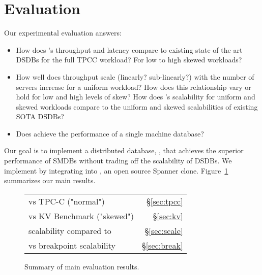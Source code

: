 \section{Evaluation}
\label{sec:eval}

Our experimental evaluation answers:
\begin{itemize}
\item How does \name{}'s throughput and latency compare to existing state of the art DSDBs for the full TPCC workload? For low to high skewed workloads? 
\item How well does throughput scale (linearly? sub-linearly?) with the number of servers increase for a uniform workload? How does this relationship vary or hold for low and high levels of skew? How does \name{}'s scalability for uniform and skewed workloads compare to the uniform and skewed scalabilities of existing SOTA DSDBs?
\item Does \name{} achieve the performance of a single machine database? 
\end{itemize}

Our goal is to implement a distributed database, \name{}, that achieves the superior performance of SMDBs without trading off the scalability of DSDBs. We implement \name{} by integrating \smdb{} \cite{cicada} into \dsdb{}\cite{cockroachdb}, an open source Spanner \cite{spanner} clone. Figure~\ref{fig:eval_summary} summarizes our main results.\\


\begin{figure}	
\begin{tabular}{@{}p{} r@{}}
\midrule
\name{} vs \dsdb{} TPC-C ("normal") & \S\ref{sec:tpcc}\\
\name{} vs \dsdb{} KV Benchmark ("skewed") & \S\ref{sec:kv}\\
\hline
\name{} scalability compared to \dsdb{} & \S\ref{sec:scale}\\
\name{} vs \dsdb{} breakpoint scalability & \S\ref{sec:break}\\
\midrule
\end{tabular}
\caption{Summary of main evaluation results.}
\label{fig:eval_summary}
\end{figure}

